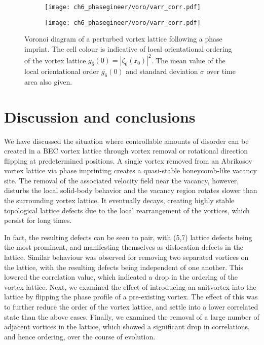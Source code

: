 \begin{figure}\ContinuedFloat\centering
    \begin{subfigure}{0.6\textwidth}
        \texttt{[image: ch6\_phasegineer/voro/varr\_corr.pdf]}
    \end{subfigure}
    \begin{subfigure}{0.6\textwidth}
        \texttt{[image: ch6\_phasegineer/voro/varr\_corr.pdf]}
    \end{subfigure}
    \caption{Voronoi diagram of a perturbed vortex lattice following a phase imprint. The cell colour is indicative of local orientational ordering of the vortex lattice $g_6(0) = |\zeta_6(\mathbf{r}_0)|^2$. The mean value of the local orientational order $\bar{g_6}(0)$ and standard deviation $\sigma$ over time area also given.}
\end{figure}

\section{Discussion and conclusions}\label{sec:ch6_conc}

We have discussed the situation where controllable amounts of disorder can be created in a BEC vortex lattice through vortex removal or rotational direction flipping at predetermined positions. A single vortex removed from an Abrikosov vortex lattice via phase imprinting creates a quasi-stable honeycomb-like vacancy site. The removal of the associated velocity field near the vacancy, however, disturbs the local solid-body behavior and the vacancy region rotates slower than the surrounding vortex lattice. It eventually decays, creating highly stable topological lattice defects due to the local rearrangement of the vortices, which persist for long times.


In fact, the resulting defects can be seen to pair, with (5,7) lattice defects being the most prominent, and manifesting themselves as dislocation defects in the lattice. Similar behaviour was observed for removing two separated vortices on the lattice, with the resulting defects being independent of one another. This lowered the correlation value, which indicated a drop in the ordering of the vortex lattice. Next, we examined the effect of introducing an anitvortex into the lattice by flipping the phase profile of a pre-existing vortex. The effect of this was to further reduce the order of the vortex lattice, and settle into a lower correlated state than the above cases. Finally, we examined the removal of a large number of adjacent vortices in the lattice, which showed a significant drop in correlations, and hence ordering, over the course of evolution.

